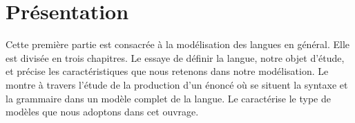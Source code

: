 \section*{Présentation}

Cette première partie est consacrée à la modélisation des langues en général. Elle est divisée en trois chapitres. Le  essaye de définir la langue, notre objet d’étude, et précise les caractéristiques que nous retenons dans notre modélisation. Le  montre à travers l’étude de la production d’un énoncé où se situent la syntaxe et la grammaire dans un modèle complet de la langue. Le  caractérise le type de modèles que nous adoptons dans cet ouvrage.
